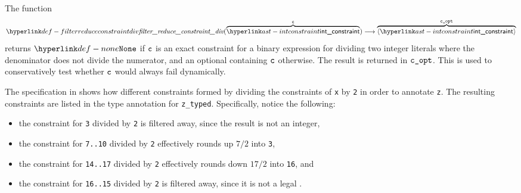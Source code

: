 \begin{mathpar}
\end{mathpar}

\begin{mathpar}
\end{mathpar}

\hypertarget{def-filterreduceconstraintdiv}{}
The function
\[
\filterreduceconstraintdiv(
  \overname{\intconstraint}{\vc}) \aslto
  \overname{\langle\intconstraint\rangle}{\vcopt}
\]
returns $\None$ if $\vc$ is an exact constraint for a binary expression for dividing two integer literals
where the denominator does not divide the numerator, and an optional containing $\vc$ otherwise.
The result is returned in $\vcopt$.
This is used to conservatively test whether $\vc$ would always fail dynamically.

The specification in 
shows how different constraints formed by dividing the constraints of \verb|x| by \verb|2|
in order to annotate \verb|z|.
The resulting constraints are listed in the type annotation for \verb|z_typed|.
Specifically, notice the following:
\begin{itemize}
  \item the constraint for \verb|3| divided by \verb|2| is filtered away,
        since the result is not an integer,
  \item the constraint for \verb|7..10| divided by \verb|2|
        effectively rounds up $7/2$ into \verb|3|,
  \item the constraint for \verb|14..17| divided by \verb|2| effectively rounds down
        $17/2$ into \verb|16|, and
  \item the constraint for \verb|16..15| divided by \verb|2| is filtered away,
        since it is not a legal \rangeconstraintterm.
\end{itemize}

